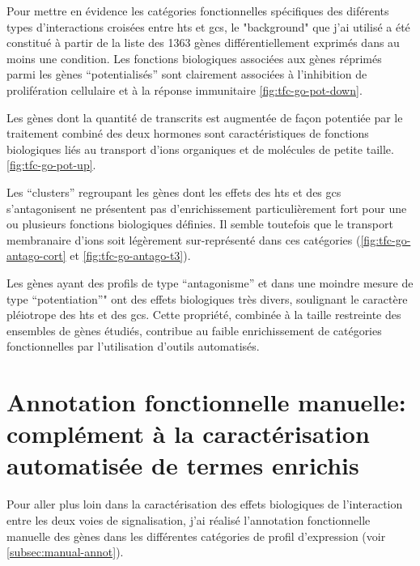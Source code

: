 \documentclass[../main.tex]{subfiles}
\begin{document}


Pour mettre en évidence les catégories fonctionnelles spécifiques des diférents types d'interactions croisées entre \glspl{ht} et \glspl{gc}, le "background" que j'ai utilisé a été constitué à partir de la liste des 1363 gènes différentiellement exprimés dans au moins une condition.
Les fonctions biologiques associées aux gènes réprimés parmi les gènes ``potentialisés'' sont clairement associées à l'inhibition de prolifération cellulaire et à la réponse immunitaire  \autoref{fig:tfc-go-pot-down}.



Les gènes dont la quantité de transcrits est augmentée de façon potentiée par le traitement combiné des deux hormones sont caractéristiques de fonctions biologiques liés au transport d'ions organiques et de molécules de petite taille. \autoref{fig:tfc-go-pot-up}.



Les ``clusters'' regroupant les gènes dont les effets des \glspl{ht} et des \glspl{gc} s'antagonisent ne présentent pas d'enrichissement particulièrement fort pour une ou plusieurs fonctions biologiques définies.
Il semble toutefois que le transport membranaire d'ions soit légèrement sur-représenté dans ces catégories (\autoref{fig:tfc-go-antago-cort} et \autoref{fig:tfc-go-antago-t3}).





Les gènes ayant des profils de type ``antagonisme'' et dans une moindre mesure de type ``potentiation''" ont des effets biologiques très divers, soulignant le caractère pléiotrope des \glspl{ht} et des \glspl{gc}.
Cette propriété, combinée à la taille restreinte des ensembles de gènes étudiés, contribue au faible enrichissement de catégories fonctionnelles par l'utilisation d'outils automatisés.


\section{Annotation fonctionnelle manuelle: complément à la caractérisation automatisée de termes enrichis}

Pour aller plus loin dans la caractérisation des effets biologiques de l'interaction entre les deux voies de signalisation, j'ai réalisé l'annotation fonctionnelle manuelle des gènes dans les différentes catégories de profil d'expression (voir \autoref{subsec:manual-annot}).
\end{document}
